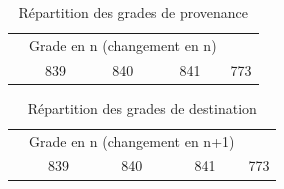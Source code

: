 \documentclass[11pt,a4paper]{article}
\begin{document}
\begin{table}[h!]
\centering
\caption{Répartition des grades de provenance} 
\label{entry}
\begin{tabular}{lcccc}
\toprule
 & \multicolumn{3}{c}{Grade en n (changement en n)} \\
 & 839 & 840 & 841  & 773 \\ 
  \hline
  
   \hline
\bottomrule
\end{tabular}
\end{table}

\medskip


\begin{table}[h!]
\centering
\caption{Répartition des grades de destination} 
\label{exit}
\begin{tabular}{lcccc}
\toprule
 & \multicolumn{3}{c}{Grade en n (changement en n+1)} \\
 & 839 & 840 & 841  & 773 \\ 
  \hline
  
   \hline
\bottomrule
\end{tabular}
\end{table}
\medskip
\end{document}
